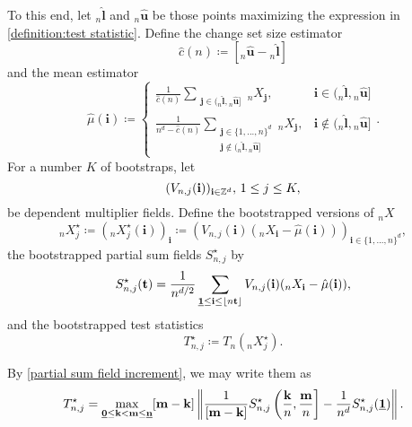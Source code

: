To this end, let ${}_{n}\hat{\mathbf{l}}$ and ${}_{n}\hat{\mathbf{u}}$ be those points maximizing the expression in \eqref{definition:test statistic}. Define the change set size estimator
\begin{equation} \label{def:cn mean estimator}
    \hat{c}(n) \coloneqq [{}_{n}\hat{\mathbf{u}} - {}_{n}\hat{\mathbf{l}}]
\end{equation}
and the mean estimator
\begin{equation} \label{def:mean estimator}
    \hat{\mu}(\mathbf{i}) \coloneqq \left\{
        \begin{array}{ll}
            \frac{1}{\hat{c}(n)} \sum\limits_{\substack{\mathbf{j} \in ({}_{n}\hat{\mathbf{l}}, {}_{n}\hat{\mathbf{u}}]}} {}_{n}X_\mathbf{j}, & \mathbf{i} \in ({}_{n}\hat{\mathbf{l}}, {}_{n}\hat{\mathbf{u}}] \\
        \frac{1}{n^d - \hat{c}(n)} \sum\limits_{\substack{\mathbf{j} \in \{1,...,n\}^d \\ \mathbf{j} \notin ({}_{n}\hat{\mathbf{l}}, {}_{n}\hat{\mathbf{u}}]}} {}_{n}X_\mathbf{j}, & \mathbf{i} \notin ({}_{n}\hat{\mathbf{l}}, {}_{n}\hat{\mathbf{u}}]
        \end{array}
        \right. .
\end{equation}
For a number $K$ of bootstraps, let
\[ (V_{n, j}(\mathbf{i}))_{\mathbf{i} \in \mathbb{Z}^d}, \, 1 \leq j \leq K, \]
be dependent multiplier fields. Define the bootstrapped versions of ${}_{n}X$
\[ {}_{n}X^{\star}_j \coloneqq \left({}_{n}X^{\star}_j(\mathbf{i})\right)_{\mathbf{i}} \coloneqq \left(V_{n, j}(\mathbf{i})({}_{n}X_\mathbf{i} - \hat{\mu}(\mathbf{i}))\right)_{\mathbf{i} \in \{1, ..., n\}^d}, \]
the bootstrapped partial sum fields $S_{n, j}^{\star}$ by
\begin{equation} \label{eq defn: bootstrapped partial sum field}
    S_{n, j}^{\star}(\mathbf{t}) = \frac{1}{n^{d/2}} \sum\limits_{\usbf[1] \leq \mathbf{i} \leq \floor{n \mathbf{t}}} V_{n, j}(\mathbf{i})({}_{n}X_\mathbf{i} - \hat{\mu}(\mathbf{i})),
\end{equation}
and the bootstrapped test statistics
\[ T_{n, j}^\star \coloneqq T_n({}_{n}X^{\star}_j). \]

By \eqref{partial sum field increment}, we may write them as
\[ T_{n, j}^\star = \max\limits_{\usbf[0] \leq \mathbf{k} < \mathbf{m} \leq \usbf[n]} [\mathbf{m}-\mathbf{k}] \left\| \frac{1}{[\mathbf{m}-\mathbf{k}]} S_{n, j}^{\star}\left(\frac{\mathbf{k}}{n}, \frac{\mathbf{m}}{n}\right] - \frac{1}{n^d} S_{n, j}^{\star}(\usbf[1]) \right\|. \]

